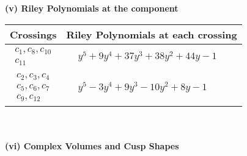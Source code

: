 \documentclass[1p]{elsarticle_modified}
\theoremstyle{definition}
\begin{document}
\newpage\renewcommand{\arraystretch}{1}
\flushleft \textbf{(v) Riley Polynomials at the component}\newline \\
\begin{tabular}{m{50pt}|m{274pt}}
Crossings & \hspace{64pt}Riley Polynomials at each crossing \\
\hline $$\begin{aligned}c_{1},c_{8},c_{10}\\c_{11}\end{aligned}$$&$\begin{aligned}
&y^5+9 y^4+37 y^3+38 y^2+44 y-1
\end{aligned}$\\
\hline $$\begin{aligned}c_{2},c_{3},c_{4}\\c_{5},c_{6},c_{7}\\c_{9},c_{12}\end{aligned}$$&$\begin{aligned}
&y^5-3 y^4+9 y^3-10 y^2+8 y-1
\end{aligned}$\\
\hline
\end{tabular}\\~\\
\newpage\flushleft \textbf{(vi) Complex Volumes and Cusp Shapes}
\end{document}
